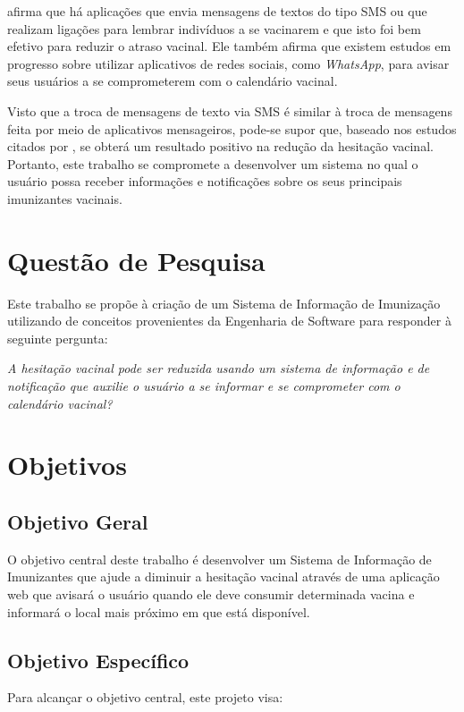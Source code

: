 \cite{gianfredi_countering_2019} afirma que há aplicações que envia mensagens de textos do tipo SMS ou que realizam ligações para lembrar indivíduos a se vacinarem e que isto foi bem efetivo para reduzir o atraso vacinal. Ele também afirma que existem estudos em  progresso sobre utilizar aplicativos de redes sociais, como \textit{WhatsApp}, para avisar seus usuários a se comprometerem com o calendário vacinal.

Visto que a troca de mensagens de texto via SMS é similar à troca de mensagens feita por meio de aplicativos mensageiros, pode-se supor que, baseado nos estudos citados por \cite{gianfredi_countering_2019}, se obterá um resultado positivo na redução da hesitação vacinal. Portanto, este trabalho se compromete a desenvolver um sistema no qual o usuário possa receber informações e notificações sobre os seus principais imunizantes vacinais.

\section{Questão de Pesquisa} \label{questao_pesquisa}
Este trabalho se propõe à criação de um Sistema de Informação de Imunização utilizando de conceitos provenientes da Engenharia de Software para responder à seguinte pergunta:


\textit{A hesitação vacinal pode ser reduzida usando um sistema de informação e de notificação que auxilie o usuário a se informar e se comprometer com o calendário vacinal?}

\section{Objetivos}

    \subsection{Objetivo Geral}
        O objetivo central deste trabalho é desenvolver um Sistema de Informação de Imunizantes que ajude a diminuir a hesitação vacinal através de uma aplicação web que avisará o usuário quando ele deve consumir determinada vacina e informará o local mais próximo em que está disponível.

    \subsection{Objetivo Específico}
        Para alcançar o objetivo central, este projeto visa:

